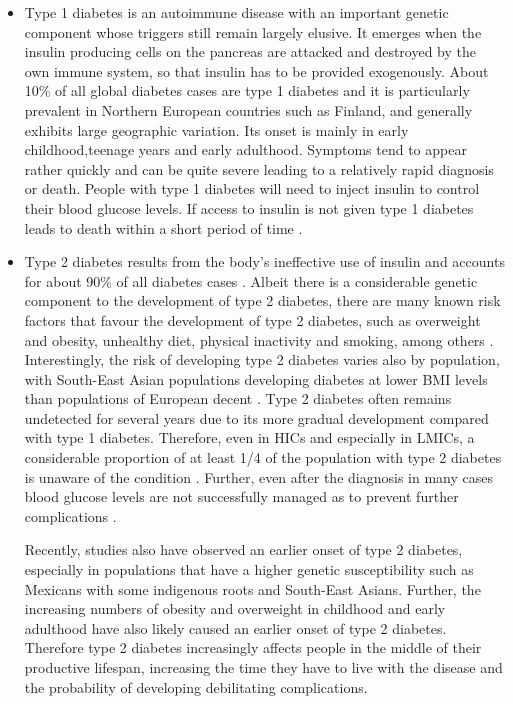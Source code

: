 \begin{itemize}
\item Type 1 diabetes is an autoimmune disease with an important genetic component whose triggers still remain largely elusive. It emerges when the insulin producing cells on the pancreas are attacked and destroyed by the own immune system, so that insulin has to be provided exogenously. About 10\% of all global diabetes cases are type 1 diabetes and it is particularly prevalent in Northern European countries such as Finland, and generally exhibits large geographic variation. Its onset is mainly in early childhood,teenage years and early adulthood. Symptoms tend to appear rather quickly and can be quite severe leading to a relatively rapid diagnosis or death. People with type 1 diabetes will need to inject insulin to control their blood glucose levels. If access to insulin is not given type 1 diabetes leads to death within a short period of time \parencite{Tuomilehto2013}. 
\item Type 2 diabetes results from the body's ineffective use of insulin and accounts for about 90\% of all diabetes cases \parencite{WorldHealthOrganization2016}. Albeit there is a considerable genetic component to the development of type 2 diabetes, there are many known risk factors that favour the development of type 2 diabetes, such as overweight and obesity, unhealthy diet, physical inactivity and smoking, among others \parencite{WorldHealthOrganization2016}. Interestingly, the risk of developing type 2 diabetes varies also by population, with South-East Asian populations developing diabetes at lower \ac{BMI} levels than populations of European decent \parencite{Ramachandran2010}. Type 2 diabetes often remains undetected for several years due to its more gradual development compared with type 1 diabetes. Therefore, even in \acp{HIC} and especially in \acp{LMIC}, a considerable proportion of at least 1/4 of the population with type 2 diabetes is unaware of the condition \parencite{Beagley2014}. Further, even after the diagnosis in many cases blood glucose levels are not successfully managed as to prevent further complications \parencite{Villalpando2010,DiabetesUK2012}.

Recently, studies also have observed an earlier onset of type 2 diabetes, especially in populations that have a higher genetic susceptibility such as Mexicans with some indigenous roots and South-East Asians. Further, the increasing numbers of obesity and overweight in childhood and early adulthood have also likely caused an earlier onset of type 2 diabetes. Therefore type 2 diabetes increasingly affects people in the middle of their productive lifespan, increasing the time they have to live with the disease and the probability of developing debilitating complications.


\end{itemize}
